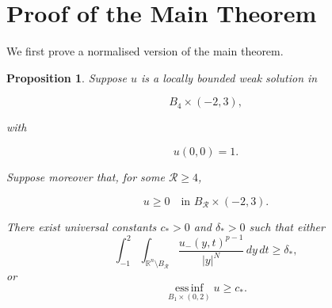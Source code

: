 \documentclass[10pt]{amsart}
\theoremstyle{plain}
\newtheorem{proposition}[lemma]{Proposition}
\theoremstyle{definition}
\theoremstyle{remark}
\numberwithin{equation}{section}
\newcommand{\R}{\mathbb R}
\begin{document}
\section{Proof of the Main Theorem}

We first prove a normalised version of the main theorem. 
\begin{proposition}\label{prop:normalized}
Suppose $u$ is a locally bounded weak solution in

\[
    B_4\times(-2,3),
\]

with

\[
    u(0,0)=1.
\]

Suppose moreover that, for some $\mathcal R\ge4$,

\[
    u\ge0
    \quad\text{in }B_{\mathcal R}\times(-2,3).
\]

There exist universal constants $c_*>0$ and $\delta_*>0$ such that either
\begin{equation}\label{eq:tail-alternative}
\int_{-1}^2
\int_{\R^n\setminus B_{\mathcal R}}
\frac{u_-(y,t)^{p-1}}{|y|^N}\,dy\,dt
\ge\delta_*,
\end{equation}
or
\begin{equation}\label{eq:positive-alternative}
\operatorname*{ess\,inf}_{B_1\times(0,2)}u
\ge c_*.
\end{equation}
\end{proposition}
\end{document}
